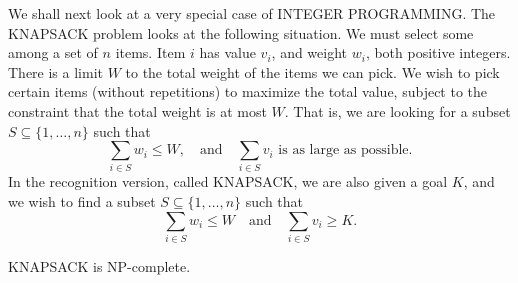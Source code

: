 \documentclass[12pt]{article}
\begin{document}
We shall next look at a very special case of \textsc{INTEGER PROGRAMMING}. The \textsc{KNAPSACK} problem looks at the following situation. We must select some among a set of $n$ items. Item $i$ has value $v_i$, and weight $w_i$, both positive integers. There is a limit $W$ to the total weight of the items we can pick. We wish to pick certain items (without repetitions) to maximize the total value, subject to the constraint that the total weight is at most $W$. That is, we are looking for a subset $S \subseteq \{1, \ldots, n\}$ such that 
\[
\sum_{i \in S} w_i \leq W, \quad \text{and} \quad \sum_{i \in S} v_i \text{ is as large as possible.}
\]
In the recognition version, called \textsc{KNAPSACK}, we are also given a goal $K$, and we wish to find a subset $S \subseteq \{1, \ldots, n\}$ such that 
\[
\sum_{i \in S} w_i \leq W \quad \text{and} \quad \sum_{i \in S} v_i \geq K.
\]
\begin{defbox}[Theorem]
  \textsc{KNAPSACK} is NP-complete.
\end{defbox}
\end{document}
